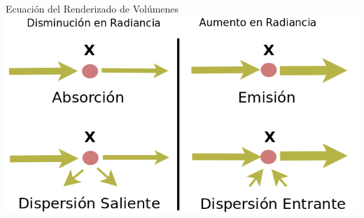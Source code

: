 \documentclass[spanish]{beamer}
\begin{document}
\begin{frame}{Ecuación del Renderizado de Volúmenes}
\includegraphics[scale = 0.6]{../figures/fenomenosrte}
\end{frame}
\end{document}
